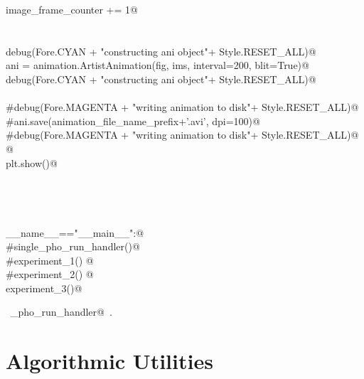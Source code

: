 \documentclass[10.0pt]{report}
\begin{document}
\begin{appendices}
\begin{flushleft}
\begin{list}{}{}
\mbox{}\verb@        image_frame_counter += 1@\\
\mbox{}\verb@@\\
\mbox{}\verb@@\\
\mbox{}\verb@    debug(Fore.CYAN + "\nStarted constructing ani object"+ Style.RESET_ALL)@\\
\mbox{}\verb@    ani = animation.ArtistAnimation(fig, ims, interval=200, blit=True)@\\
\mbox{}\verb@    debug(Fore.CYAN + "\nFinished constructing ani object"+ Style.RESET_ALL)@\\
\mbox{}\verb@@\\
\mbox{}\verb@    #debug(Fore.MAGENTA + "\nStarted writing animation to disk"+ Style.RESET_ALL)@\\
\mbox{}\verb@    #ani.save(animation_file_name_prefix+'.avi', dpi=100)@\\
\mbox{}\verb@    #debug(Fore.MAGENTA + "\nFinished writing animation to disk"+ Style.RESET_ALL)@\\
\mbox{}\verb@    @\\
\mbox{}\verb@    plt.show()@\\
\mbox{}\verb@@\\
\mbox{}\verb@@\\
\mbox{}\verb@@\\
\mbox{}\verb@@\\
\mbox{}\verb@if __name__=="__main__":@\\
\mbox{}\verb@     #single_pho_run_handler()@\\
\mbox{}\verb@     #experiment_1() @\\
\mbox{}\verb@     #experiment_2() @\\
\mbox{}\verb@     experiment_3()@\\
\mbox{}\verb@@{\NWsep}
\end{list}
\vspace{-1.5ex}
\footnotesize
\begin{list}{}{\setlength{\itemsep}{-\parsep}\setlength{\itemindent}{-\leftmargin}}
\item \NWtxtIdentsUsed\nobreak\  \verb@single_pho_run_handler@\nobreak\ .
\item{}
\end{list}
\vspace{4ex}
\end{flushleft}


\section{Algorithmic Utilities}


\end{appendices}
\end{document}
